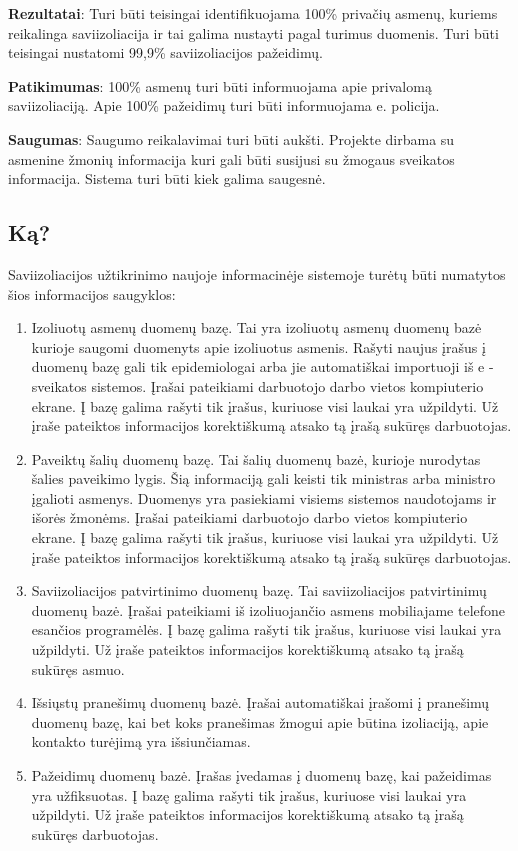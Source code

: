 \documentclass{VUMIFPSkursinis}
\begin{document}
\textbf{Rezultatai}:
Turi būti teisingai identifikuojama 100\% privačių asmenų, kuriems reikalinga saviizoliacija ir tai galima nustayti pagal turimus duomenis. 
Turi būti teisingai nustatomi 99,9\% saviizoliacijos pažeidimų.

\textbf{Patikimumas}:
100\% asmenų turi būti informuojama apie privalomą saviizoliaciją. Apie 100\% pažeidimų turi būti informuojama e. policija.

\textbf{Saugumas}:
Saugumo reikalavimai turi būti aukšti. Projekte dirbama su asmenine žmonių informacija kuri gali būti susijusi su žmogaus sveikatos informacija. Sistema turi būti kiek galima saugesnė.

\subsection{Ką?}\label{sec:ISReqWhat}
Saviizoliacijos užtikrinimo naujoje informacinėje sistemoje turėtų būti numatytos šios informacijos saugyklos:
\begin{enumerate}
	\item Izoliuotų asmenų duomenų bazę. 
	Tai yra izoliuotų asmenų duomenų bazė kurioje saugomi duomenyts apie izoliuotus asmenis. Rašyti naujus įrašus į duomenų bazę gali 
	tik epidemiologai arba jie automatiškai importuoji iš e - sveikatos sistemos. Įrašai pateikiami darbuotojo darbo vietos kompiuterio ekrane. 
	Į bazę galima rašyti tik įrašus, kuriuose visi laukai yra užpildyti. Už įraše pateiktos informacijos korektiškumą atsako tą įrašą sukūręs darbuotojas.

	\item Paveiktų šalių duomenų bazę.
	Tai šalių duomenų bazė, kurioje nurodytas šalies paveikimo lygis. Šią informaciją gali keisti tik ministras arba ministro įgalioti 
	asmenys. Duomenys yra pasiekiami visiems sistemos naudotojams ir išorės žmonėms. 
	Įrašai pateikiami darbuotojo darbo vietos kompiuterio ekrane.
	Į bazę galima rašyti tik įrašus, kuriuose visi laukai yra užpildyti.
	Už įraše pateiktos informacijos korektiškumą atsako tą įrašą sukūręs darbuotojas.

	\item Saviizoliacijos patvirtinimo duomenų bazę.
	Tai saviizoliacijos patvirtinimų duomenų bazė. Įrašai pateikiami iš izoliuojančio asmens mobiliajame telefone esančios programėlės.
	Į bazę galima rašyti tik įrašus, kuriuose visi laukai yra užpildyti.
	Už įraše pateiktos informacijos korektiškumą atsako tą įrašą sukūręs asmuo.

	\item Išsiųstų pranešimų duomenų bazė.
	Įrašai automatiškai įrašomi į pranešimų duomenų bazę, kai bet koks pranešimas žmogui apie būtina izoliaciją, apie kontakto turėjimą yra išsiunčiamas. 

	\item Pažeidimų duomenų bazė. 
	Įrašas įvedamas į duomenų bazę, kai pažeidimas yra užfiksuotas. 
	Į bazę galima rašyti tik įrašus, kuriuose visi laukai yra užpildyti.
	Už įraše pateiktos informacijos korektiškumą atsako tą įrašą sukūręs darbuotojas.
\end{enumerate} 
\end{document}
